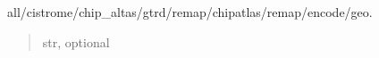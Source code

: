 \documentclass[letterpaper,10pt,english]{sphinxmanual}
\begin{document}
\begin{fulllineitems}
\begin{fulllineitems}
\end{fulllineitems}


\begin{fulllineitems}
\label{\detokenize{index:TRAPT.Tools.Args.source}}
\pysigstartsignatures
{}
\pysigstopsignatures
\sphinxAtStartPar
all/cistrome/chip\_altas/gtrd/remap/chip\sphinxhyphen{}atlas/remap/encode/geo.
\begin{quote}\begin{description}
\sphinxAtStartPar
str, optional

\end{description}\end{quote}

\end{fulllineitems}


\end{fulllineitems}

\end{document}
